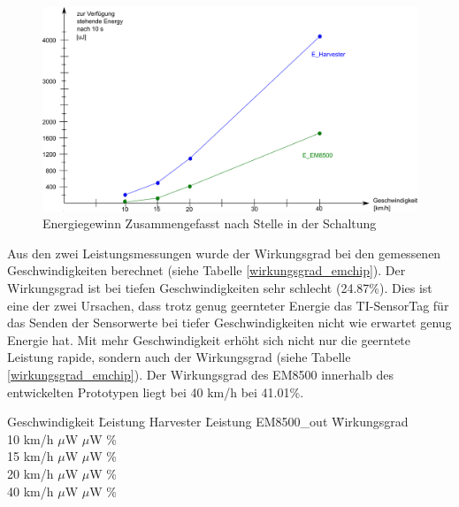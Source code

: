 \begin{figure}[ht]
    \includegraphics[width=1\textwidth]{4Resultate/imag/EnergyGewinnNachStelle.png} 
    \caption{Energiegewinn Zusammengefasst nach Stelle in der Schaltung}
    \label{zsmEnergyGewinn}
\end{figure}

Aus den zwei Leistungsmessungen wurde der Wirkungsgrad bei den gemessenen Geschwindigkeiten berechnet (siehe Tabelle \ref{wirkungsgrad_emchip}). Der Wirkungsgrad ist bei tiefen Geschwindigkeiten sehr schlecht (24.87\thinspace\%). Dies ist eine der zwei Ursachen, dass trotz genug geernteter Energie das TI-SensorTag für das Senden der Sensorwerte bei tiefer Geschwindigkeiten nicht wie erwartet genug Energie hat. Mit mehr Geschwindigkeit erhöht sich nicht nur die geerntete Leistung rapide, sondern auch der Wirkungsgrad (siehe Tabelle \ref{wirkungsgrad_emchip}). Der Wirkungsgrad des EM8500 innerhalb des entwickelten Prototypen liegt bei 40 km/h  bei 41.01\thinspace\%.  

\begin{minipage}{\textwidth}
    \label{wirkungsgrad_emchip}
    \begin{tabbing}
        Geschwindigkeit \quad\= Leistung Harvester \quad\= Leistung EM8500\_out \quad\= Wirkungsgrad\\[0.8ex]
        10 km/h    $\mu$W    $\mu$W \thinspace\%  \\
        15 km/h    $\mu$W   $\mu$W \thinspace\%  \\
        20 km/h  $\mu$W   $\mu$W \thinspace\%  \\
        40 km/h  $\mu$W  $\mu$W \thinspace\%  \\
    \end{tabbing}
\end{minipage}  


